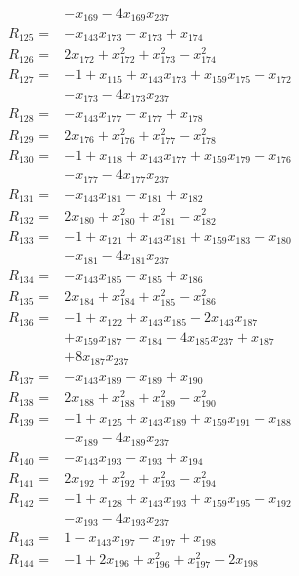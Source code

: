\begin{align*}
&-x_{169} -4x_{169}x_{237}\\[3pt]
R_{125}={}&-x_{143}x_{173} -x_{173} +x_{174}\\[3pt]
R_{126}={}&2x_{172} +x_{172}^{2} +x_{173}^{2} -x_{174}^{2}\\[3pt]
R_{127}={}&-1 +x_{115} +x_{143}x_{173} +x_{159}x_{175} -x_{172}\\
&-x_{173} -4x_{173}x_{237}\\[3pt]
R_{128}={}&-x_{143}x_{177} -x_{177} +x_{178}\\[3pt]
R_{129}={}&2x_{176} +x_{176}^{2} +x_{177}^{2} -x_{178}^{2}\\[3pt]
R_{130}={}&-1 +x_{118} +x_{143}x_{177} +x_{159}x_{179} -x_{176}\\
&-x_{177} -4x_{177}x_{237}\\[3pt]
R_{131}={}&-x_{143}x_{181} -x_{181} +x_{182}\\[3pt]
R_{132}={}&2x_{180} +x_{180}^{2} +x_{181}^{2} -x_{182}^{2}\\[3pt]
R_{133}={}&-1 +x_{121} +x_{143}x_{181} +x_{159}x_{183} -x_{180}\\
&-x_{181} -4x_{181}x_{237}\\[3pt]
R_{134}={}&-x_{143}x_{185} -x_{185} +x_{186}\\[3pt]
R_{135}={}&2x_{184} +x_{184}^{2} +x_{185}^{2} -x_{186}^{2}\\[3pt]
R_{136}={}&-1 +x_{122} +x_{143}x_{185} -2x_{143}x_{187}\\
&+x_{159}x_{187} -x_{184} -4x_{185}x_{237} +x_{187}\\
&+8x_{187}x_{237}\\[3pt]
R_{137}={}&-x_{143}x_{189} -x_{189} +x_{190}\\[3pt]
R_{138}={}&2x_{188} +x_{188}^{2} +x_{189}^{2} -x_{190}^{2}\\[3pt]
R_{139}={}&-1 +x_{125} +x_{143}x_{189} +x_{159}x_{191} -x_{188}\\
&-x_{189} -4x_{189}x_{237}\\[3pt]
R_{140}={}&-x_{143}x_{193} -x_{193} +x_{194}\\[3pt]
R_{141}={}&2x_{192} +x_{192}^{2} +x_{193}^{2} -x_{194}^{2}\\[3pt]
R_{142}={}&-1 +x_{128} +x_{143}x_{193} +x_{159}x_{195} -x_{192}\\
&-x_{193} -4x_{193}x_{237}\\[3pt]
R_{143}={}&1 -x_{143}x_{197} -x_{197} +x_{198}\\[3pt]
R_{144}={}&-1 +2x_{196} +x_{196}^{2} +x_{197}^{2} -2x_{198}\\

\end{align*}
